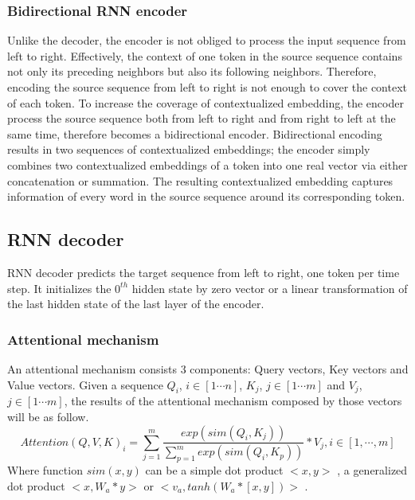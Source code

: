 \subsubsection{Bidirectional RNN encoder}
Unlike the decoder, the encoder is not obliged to process the input sequence from left to right. Effectively, the context of one token in the source sequence contains not only its preceding neighbors but also its following neighbors. Therefore, encoding the source sequence from left to right is not enough to cover the context of each token. To increase the coverage of contextualized embedding, the encoder process the source sequence both from left to right and from right to left at the same time, therefore becomes a bidirectional encoder. Bidirectional encoding results in two sequences of contextualized embeddings; the encoder simply combines two contextualized embeddings of a token into one real vector via either concatenation or summation. The resulting contextualized embedding captures information of every word in the source sequence around its corresponding token. 
\subsection{RNN decoder}
RNN decoder predicts the target sequence from left to right, one token per time step. It initializes the $0^{th}$ hidden state by zero vector or a linear transformation of the last hidden state of the last layer of the encoder. 
\subsubsection{Attentional mechanism \label{ssec:attention}}
An attentional mechanism consists 3 components: Query vectors, Key vectors and Value vectors. Given a sequence $Q_i$, $i \in [1 \cdots n]$, $K_j$, $j \in [1 \cdots m]$ and $V_j$, $j \in [1 \cdots m]$, the results
of the attentional mechanism composed by those vectors will be as follow.
\begin{equation}
Attention(Q,V,K)_i = \displaystyle{\mathop{\sum}_{j=1}^{m}} \frac{exp(sim(Q_i,K_j))}{\displaystyle{\mathop{\sum}_{p=1}^{m}}exp(sim(Q_i,K_p))}*V_j, i \in [1, \cdots, m]
\end{equation}
Where function $sim(x,y)$ can be a simple dot product $<x,y>$ \citep{Vaswani17attention}, a generalized dot product $<x,W_a*y>$ or $<v_a,tanh(W_a*[x,y])>$ \citep{Luong15stanford, Bahdanau15learning}.

